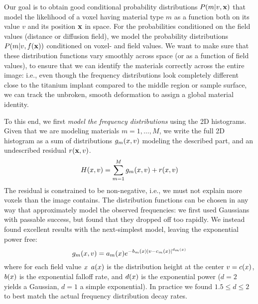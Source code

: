 Our goal is to obtain good conditional probability distributions $P(m|v,\mathbf{x})$
that model the likelihood of a voxel having material type $m$ as a function
both on its value $v$ and its position $\mathbf{x}$ in space. For the probabilities
conditioned on the field values (distance or diffusion field), we model
the probability distributions $P(m|v,f(\mathbf{x}))$ conditioned on
voxel- and field values. We want to make sure that these distribution
functions vary smoothly across space (or as a function of field values),
to ensure that we can identify the materials correctly across the entire
image: i.e., even though the frequency distributions look completely different
close to the titanium implant compared to the middle region or sample surface,
we can track the unbroken, smooth deformation to assign a global material
identity.

To this end, we first {\it model the frequency distributions} using the
2D histograms. Given that we are modeling materials $m=1,\ldots,M$,
we write the full 2D histogram as a sum of distributions
$g_m(x,v)$ modeling the described part, and an undescribed
residual $r(\mathbf{x},v)$.
\begin{equation}
  \label{eq:hist}
  H(x,v) = \sum_{m=1}^M g_m(x,v) + r(x,v)
\end{equation}
The residual is constrained to be non-negative, i.e., we must not explain
more voxels than the image contains.
The distribution functions can be chosen in any way that approximately
model the observed frequencies: we first used Gaussians with passable success,
but found that they dropped off too rapidly. We instead found excellent results
with the next-simplest model, leaving the exponential power free:
\begin{equation}
  \label{eq:dist-form}
  g_m(x,v) = a_m(x) e^{-b_m(x) |v-c_m(x)|^{d_m(x)}}
\end{equation}
where for each field value $x$
$a(x)$ is the distribution height at the center $v=c(x)$,
$b(x)$ is the exponential falloff rate, and $d(x)$ is
the exponential power ($d=2$ yields a Gaussian, $d=1$ a simple exponential).
In practice we found $1.5\le d \le 2$ to best match the actual frequency
distribution decay rates.

